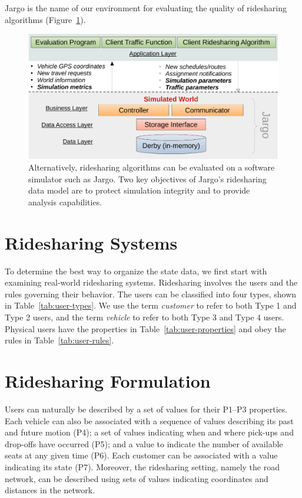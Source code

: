 Jargo is the name of our environment for evaluating the quality of ridesharing
algorithms (Figure~\ref{fig:architecture}).

\begin{figure}[h]
\centering
\includegraphics[width=120mm]{res/architecture}
\caption{Alternatively, ridesharing algorithms can be evaluated on a software
simulator such as Jargo. Two key objectives of Jargo's ridesharing data model
are to protect simulation integrity and to provide analysis capabilities.}
\label{fig:architecture}
\end{figure}

\section{Ridesharing Systems}
\label{ch:1:sec:ridesharing-systems}
To determine the best way to organize the state data, we first start with
examining real-world ridesharing systems.  Ridesharing involves the
users and the rules governing their behavior. The users can be
classified into four types, shown in Table~\ref{tab:user-types}.  We use the
term \emph{customer} to refer to both Type 1 and Type 2 users, and the term
\emph{vehicle} to refer to both Type 3 and Type 4 users.  Physical users have
the properties in Table~\ref{tab:user-properties} and obey the rules in
Table~\ref{tab:user-rules}.

\section{Ridesharing Formulation}
\label{ch:1:sec:ridesharing-formulation}
Users can naturally be described by a set of values for their P1--P3
properties. Each vehicle can also be associated with a sequence of values
describing its past and future motion (P4); a set of values indicating when and
where pick-ups and drop-offs have occurred (P5); and a value to indicate the
number of available seats at any given time (P6). Each customer can be
associated with a value indicating its state (P7). Moreover, the ridesharing
setting, namely the road network, can be described using sets of values
indicating coordinates and distances in the network.

